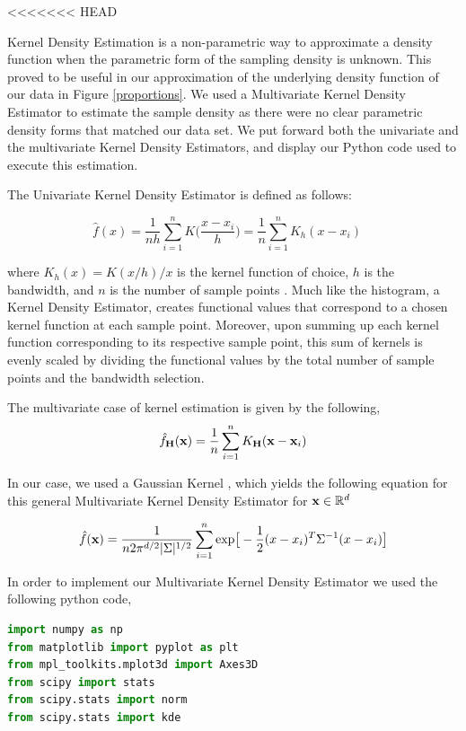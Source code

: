 \documentclass[letterpaper,12pt]{article}
\theoremstyle{definition}
\begin{document}
\begin{spacing}{1.5}
<<<<<<< HEAD

    Kernel Density Estimation is a non-parametric way to approximate a density function when the parametric form of the sampling density is unknown. This proved to be useful in our approximation of the underlying density function of our data in Figure \ref{proportions}. We used a Multivariate Kernel Density Estimator to estimate the sample density as there were no clear parametric density forms that matched our data set. We put forward both the univariate and the multivariate Kernel Density Estimators, and display our Python code used to execute this estimation.

    The Univariate Kernel Density Estimator is defined as follows:

    \[\hat{f}(x) = \frac{1}{nh} \sum_{i=1}^n K\Big(\frac{x-x_i}{h}\Big)= \frac{1}{n}\sum_{i=1}^n K_h (x - x_i) \quad \]

    where $K_h(x) =  K(x/h)/x$ is the kernel function of choice, $h$ is the bandwidth, and $n$ is the number of sample points \citet{Scott:2015}. Much like the histogram, a Kernel Density Estimator, creates functional values that correspond to a chosen kernel function at each sample point. Moreover, upon summing up each kernel function corresponding to its respective sample point, this sum of kernels is evenly scaled by dividing the functional values by the total number of sample points and the bandwidth selection.

    The multivariate case of kernel estimation is given by the following,
    \[\hat{f}_\bold{H}(\bold{x})= \frac1n \sum_{i=1}^n K_\bold{H} (\bold{x} - \bold{x}_i)\]

    In our case, we used a Gaussian Kernel , which yields the following equation for this general Multivariate Kernel Density Estimator for $\bold{x} \in \mathbb{R}^d$

    \[\hat{f}(\bold{x}) = \frac{1}{n2\pi ^{d/2} |\Sigma|^{1/2}} \sum_{i=1}^n \text{exp}\big[-\frac{1}{2}(x-x_i)^T\Sigma ^{-1}(x-x_i)\big]\]
    \citet{Scott:2005}

    In order to implement our Multivariate Kernel Density Estimator we used the following python code,\\

    \begin{lstlisting}[language=Python, caption=MVKDE.py]
import numpy as np
from matplotlib import pyplot as plt
from mpl_toolkits.mplot3d import Axes3D
from scipy import stats
from scipy.stats import norm
from scipy.stats import kde


\end{lstlisting}
\end{spacing}
\end{document}
